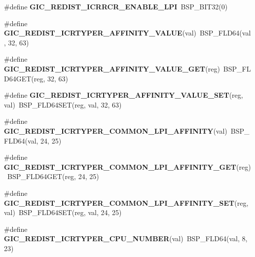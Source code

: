 \begin{DoxyCompactItemize}
\#define {\bfseries G\+I\+C\+\_\+\+R\+E\+D\+I\+S\+T\+\_\+\+I\+C\+R\+R\+C\+R\+\_\+\+E\+N\+A\+B\+L\+E\+\_\+\+L\+PI}~B\+S\+P\+\_\+\+B\+I\+T32(0)
\item 
\mbox{\label{arm-gic-regs_8h_af39acb67e6326031b05ca4499e76b4fc}} 
\#define {\bfseries G\+I\+C\+\_\+\+R\+E\+D\+I\+S\+T\+\_\+\+I\+C\+R\+T\+Y\+P\+E\+R\+\_\+\+A\+F\+F\+I\+N\+I\+T\+Y\+\_\+\+V\+A\+L\+UE}(val)~B\+S\+P\+\_\+\+F\+L\+D64(val, 32, 63)
\item 
\mbox{\label{arm-gic-regs_8h_a1df1e06b2b59e28a989ad51cb22bee5e}} 
\#define {\bfseries G\+I\+C\+\_\+\+R\+E\+D\+I\+S\+T\+\_\+\+I\+C\+R\+T\+Y\+P\+E\+R\+\_\+\+A\+F\+F\+I\+N\+I\+T\+Y\+\_\+\+V\+A\+L\+U\+E\+\_\+\+G\+ET}(reg)~B\+S\+P\+\_\+\+F\+L\+D64\+G\+ET(reg, 32, 63)
\item 
\mbox{\label{arm-gic-regs_8h_a63e59912c5553f298f2921d81f5c33bb}} 
\#define {\bfseries G\+I\+C\+\_\+\+R\+E\+D\+I\+S\+T\+\_\+\+I\+C\+R\+T\+Y\+P\+E\+R\+\_\+\+A\+F\+F\+I\+N\+I\+T\+Y\+\_\+\+V\+A\+L\+U\+E\+\_\+\+S\+ET}(reg,  val)~B\+S\+P\+\_\+\+F\+L\+D64\+S\+ET(reg, val, 32, 63)
\item 
\mbox{\label{arm-gic-regs_8h_a38969b033aa5dae9a92301482f2cb5e1}} 
\#define {\bfseries G\+I\+C\+\_\+\+R\+E\+D\+I\+S\+T\+\_\+\+I\+C\+R\+T\+Y\+P\+E\+R\+\_\+\+C\+O\+M\+M\+O\+N\+\_\+\+L\+P\+I\+\_\+\+A\+F\+F\+I\+N\+I\+TY}(val)~B\+S\+P\+\_\+\+F\+L\+D64(val, 24, 25)
\item 
\mbox{\label{arm-gic-regs_8h_a7f7fcdc13f8a8834532e410c6f337c96}} 
\#define {\bfseries G\+I\+C\+\_\+\+R\+E\+D\+I\+S\+T\+\_\+\+I\+C\+R\+T\+Y\+P\+E\+R\+\_\+\+C\+O\+M\+M\+O\+N\+\_\+\+L\+P\+I\+\_\+\+A\+F\+F\+I\+N\+I\+T\+Y\+\_\+\+G\+ET}(reg)~B\+S\+P\+\_\+\+F\+L\+D64\+G\+ET(reg, 24, 25)
\item 
\mbox{\label{arm-gic-regs_8h_a0d94e3e8b4d276cd0ef2b6388bc30739}} 
\#define {\bfseries G\+I\+C\+\_\+\+R\+E\+D\+I\+S\+T\+\_\+\+I\+C\+R\+T\+Y\+P\+E\+R\+\_\+\+C\+O\+M\+M\+O\+N\+\_\+\+L\+P\+I\+\_\+\+A\+F\+F\+I\+N\+I\+T\+Y\+\_\+\+S\+ET}(reg,  val)~B\+S\+P\+\_\+\+F\+L\+D64\+S\+ET(reg, val, 24, 25)
\item 
\mbox{\label{arm-gic-regs_8h_a2b4f49998e776539536976f574ed9a44}} 
\#define {\bfseries G\+I\+C\+\_\+\+R\+E\+D\+I\+S\+T\+\_\+\+I\+C\+R\+T\+Y\+P\+E\+R\+\_\+\+C\+P\+U\+\_\+\+N\+U\+M\+B\+ER}(val)~B\+S\+P\+\_\+\+F\+L\+D64(val, 8, 23)

\end{DoxyCompactItemize}
